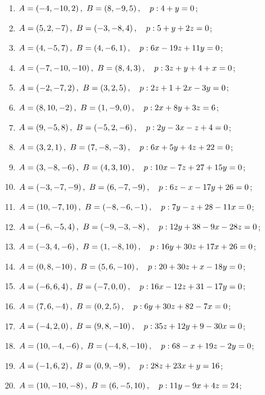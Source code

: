 	\begin{enumerate}
		\setcounter{enumi}{\value{tasks}}

			\item \( A = \left( -4, -10, 2 \right), ~ B = \left( 8, -9, 5 \right), \quad p: 4 + y = 0 \);
			\item \( A = \left( 5, 2, -7 \right), ~ B = \left( -3, -8, 4 \right), \quad p: 5 + y + 2z = 0 \);
			\item \( A = \left( 4, -5, 7 \right), ~ B = \left( 4, -6, 1 \right), \quad p: 6x - 19z + 11y = 0 \);
			\item \( A = \left( -7, -10, -10 \right), ~ B = \left( 8, 4, 3 \right), \quad p: 3z + y + 4 + x = 0 \);
			\item \( A = \left( -2, -7, 2 \right), ~ B = \left( 3, 2, 5 \right), \quad p: 2z + 1 + 2x - 3y = 0 \);
			\item \( A = \left( 8, 10, -2 \right), ~ B = \left( 1, -9, 0 \right), \quad p: 2x + 8y + 3z = 6 \);
			\item \( A = \left( 9, -5, 8 \right), ~ B = \left( -5, 2, -6 \right), \quad p: 2y - 3x - z + 4 = 0 \);
			\item \( A = \left( 3, 2, 1 \right), ~ B = \left( 7, -8, -3 \right), \quad p: 6x + 5y + 4z + 22 = 0 \);
			\item \( A = \left( 3, -8, -6 \right), ~ B = \left( 4, 3, 10 \right), \quad p: 10x - 7z + 27 + 15y = 0 \);
			\item \( A = \left( -3, -7, -9 \right), ~ B = \left( 6, -7, -9 \right), \quad p: 6z - x - 17y + 26 = 0 \);
			\item \( A = \left( 10, -7, 10 \right), ~ B = \left( -8, -6, -1 \right), \quad p: 7y - z + 28 - 11x = 0 \);
			\item \( A = \left( -6, -5, 4 \right), ~ B = \left( -9, -3, -8 \right), \quad p: 12y + 38 - 9x - 28z = 0 \);
			\item \( A = \left( -3, 4, -6 \right), ~ B = \left( 1, -8, 10 \right), \quad p: 16y + 30z + 17x + 26 = 0 \);
			\item \( A = \left( 0, 8, -10 \right), ~ B = \left( 5, 6, -10 \right), \quad p: 20 + 30z + x - 18y = 0 \);
			\item \( A = \left( -6, 6, 4 \right), ~ B = \left( -7, 0, 0 \right), \quad p: 16x - 12z + 31 - 17y = 0 \);
			\item \( A = \left( 7, 6, -4 \right), ~ B = \left( 0, 2, 5 \right), \quad p: 6y + 30z + 82 - 7x = 0 \);
			\item \( A = \left( -4, 2, 0 \right), ~ B = \left( 9, 8, -10 \right), \quad p: 35z + 12y + 9 - 30x = 0 \);
			\item \( A = \left( 10, -4, -6 \right), ~ B = \left( -4, 8, -10 \right), \quad p: 68 - x + 19z - 2y = 0 \);
			\item \( A = \left( -1, 6, 2 \right), ~ B = \left( 0, 9, -9 \right), \quad p: 28z + 23x + y = 16 \);
			\item \( A = \left( 10, -10, -8 \right), ~ B = \left( 6, -5, 10 \right), \quad p: 11y - 9x + 4z = 24 \);

		\setcounter{tasks}{\value{enumi}}
	\end{enumerate}


